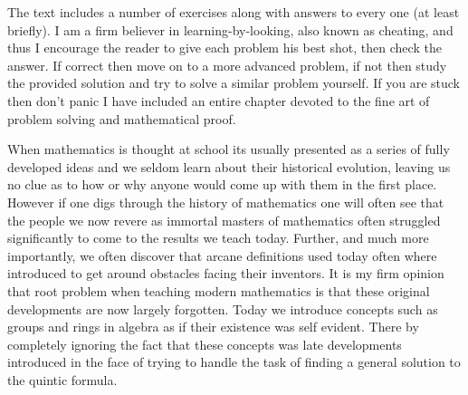 The text includes a number of exercises along with answers to every one (at least briefly). I am a firm believer in learning-by-looking, also known as cheating, and thus I encourage the reader to give each problem his best shot, then check the answer. If correct then move on to a more advanced problem, if not then study the provided solution and try to solve a similar problem yourself. If you are stuck then don't panic I have included an entire chapter devoted to the fine art of problem solving and mathematical proof.

When mathematics is thought at school its usually presented as a series of fully developed ideas and we seldom learn about their historical evolution, leaving us no clue as to how or why anyone would come up with them in the first place. However if one digs through the history of mathematics one will often see that the people we now revere as immortal masters of mathematics often struggled significantly to come to the results we teach today. Further, and much more importantly, we often discover that arcane definitions used today often where introduced to get around obstacles facing their inventors. It is my firm opinion that root problem when teaching modern mathematics is that these original developments are now largely forgotten. Today we introduce concepts such as groups and rings in algebra as if their existence was self evident. There by completely ignoring the fact that these concepts was late developments introduced in the face of trying to handle the task of finding a general solution to the quintic formula.

